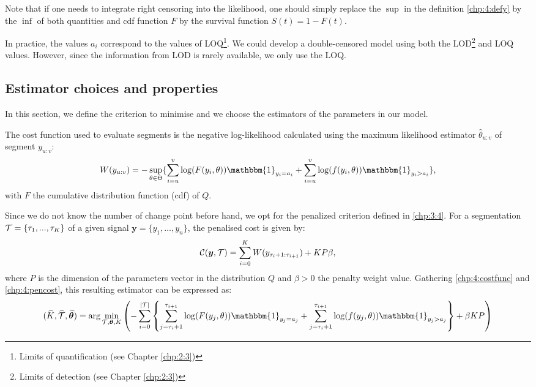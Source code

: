 Note that if one needs to integrate right censoring into the likelihood, one should simply replace the $\sup$ in the definition \ref{chp:4:defy} by the $\inf$ of both quantities and cdf function $F$ by the survival function $S(t)=1-F(t)$. 

In practice, the values $a_i$ correspond to the values of LOQ\footnote{Limits of quantification (see Chapter \ref{chp:2:3})}. We could develop a double-censored model using both the LOD\footnote{Limits of detection (see Chapter \ref{chp:2:3})} and LOQ values. However, since the information from LOD is rarely available, we only use the LOQ.

\subsection{Estimator choices and properties}

In this section, we define the criterion to minimise and we choose the estimators of the parameters in our model. 

The cost function used to evaluate segments is the negative log-likelihood calculated using the maximum likelihood estimator $\widehat{\theta}_{u:v}$ of segment $y_{u:v}$: 
\begin{equation}\label{chp:4:costfunc}
W(y_{u:v}) = -\sup_{\theta\in\Theta}\{\sum_{i=u}^v\log(F(y_i,\theta))\mathbbm{1}_{y_i=a_i}+\sum_{i=u}^v\log(f(y_i,\theta))\mathbbm{1}_{y_i>a_i}\},
\end{equation}
with $F$ the cumulative distribution function (cdf) of $Q$.

Since we do not know the number of change point before hand, we opt for the penalized criterion defined in \ref{chp:3:4}. For a segmentation ${\mathcal T} = \{\tau_1,...,\tau_K\}$ of a given signal $\bm y =\{y_1,\dots,y_n\}$, the penalised cost is given by: 
\begin{equation}\label{chp:4:pencost}
{\mathcal C}(\bm y,{\mathcal T})=\sum_{i=0}^{K}  W(y_{\tau_i+1:\tau_{i+1}}) + KP\beta,
\end{equation}
where $P$ is the dimension of the parameters vector in the distribution $Q$ and $\beta > 0$ the penalty weight value. Gathering \eqref{chp:4:costfunc} and \eqref{chp:4:pencost}, this resulting estimator can be expressed as:  
\begin{equation}\label{chp:4:estim}
(\widehat{K},\widehat{\TT},\widehat{\bm \theta}) = \arg\min_{\TT,\bm \theta,K} \left(- \sum_{i=0}^{\lvert \TT \rvert}  \left\{\sum_{j=\tau_i+1}^{\tau_{i+1}}\log(F(y_j,\theta))\mathbbm{1}_{y_j=a_j}+\sum_{j=\tau_i+1}^{\tau_{i+1}}\log(f(y_j,\theta))\mathbbm{1}_{y_j>a_j}\right\}+\beta KP\right)
\end{equation}


